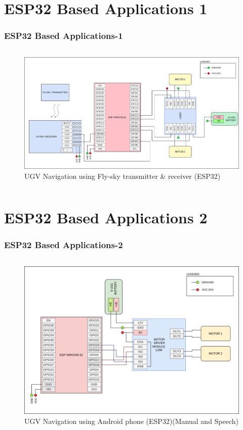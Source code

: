 \documentclass{beamer}
\begin{document}
\section{ESP32 Based Applications 1}
\begin{frame}
\frametitle{ESP32 Based Applications-1}
\begin{columns}
	\begin{figure}[h!]
  		\centering
  		\includegraphics[width=\linewidth]{./figs/Wiring_UGV_flysky.png}
  		\caption{UGV Navigation using Fly-sky transmitter \& receiver (ESP32)}
  		\label{Wiring_UGV_flysky}
	\end{figure}
\end{columns}
\end{frame}

\section{ESP32 Based Applications 2}
\begin{frame}
\frametitle{ESP32 Based Applications-2}
\begin{columns}
	\begin{figure}[h!]
  		\centering
  		\includegraphics[width=\linewidth]{./figs/Wiring_UGV_speech.png}
  		\caption{UGV Navigation using Android phone (ESP32)(Manual and Speech)}
  		\label{Wiring_UGV_speech}
	\end{figure}
\end{columns}
\end{frame}
\end{document}
